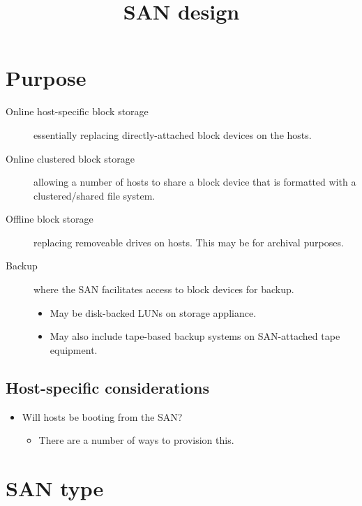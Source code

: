 \documentclass[slides]{pgnotes}
\title{SAN design}
\begin{document}
\maketitle

\tableofcontents

\section{Purpose}
\label{sec:purpose}

\begin{description}
\item[Online host-specific block storage]
essentially replacing directly-attached block devices on the hosts.
\item[Online clustered block storage]
allowing a number of hosts to share a block device that is formatted
with a clustered/shared file system.
\item[Offline block storage]
replacing removeable drives on hosts. This may be for archival purposes.
\item[Backup]
  where the SAN facilitates access to block devices for backup.
  \begin{itemize}
  \item May be disk-backed LUNs on storage appliance.
  \item May also include tape-based backup systems on SAN-attached tape equipment.
  \end{itemize}
\end{description}

\subsection{Host-specific considerations}

\begin{itemize}
\item
  Will hosts be booting from the SAN?
  \begin{itemize}
  \item There are a number of ways to  provision this.
  \end{itemize}
\end{itemize}

\section{SAN type}
\label{sec:san-type}
\end{document}
